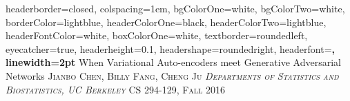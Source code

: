 \documentclass[portrait,fontscale=0.40,paperwidth=30in, paperheight=40in,margin=1in]{baposter} %
\theoremstyle{definition}
\theoremstyle{remark}
\begin{document}
\begin{poster}
{
headerborder=closed, %
colspacing=1em, %
bgColorOne=white, %
bgColorTwo=white, %
borderColor=lightblue, %
headerColorOne=black, %
headerColorTwo=lightblue, %
headerFontColor=white, %
boxColorOne=white, %
textborder=roundedleft, %
eyecatcher=true, %
headerheight=0.1\textheight, %
headershape=roundedright, %
headerfont=\large\bf\textsc, %
linewidth=2pt %
}
%
{
} %
{
{When Variational Auto-encoders meet Generative Adversarial Networks}
\vspace{0.5em}
} %
{\textsc{Jianbo Chen, Billy Fang, Cheng Ju
\hspace{12pt}
\textit{Departments of Statistics and Biostatistics, UC Berkeley}
\hspace{12pt} CS 294-129, Fall 2016
}} %





\end{poster}
\end{document}
